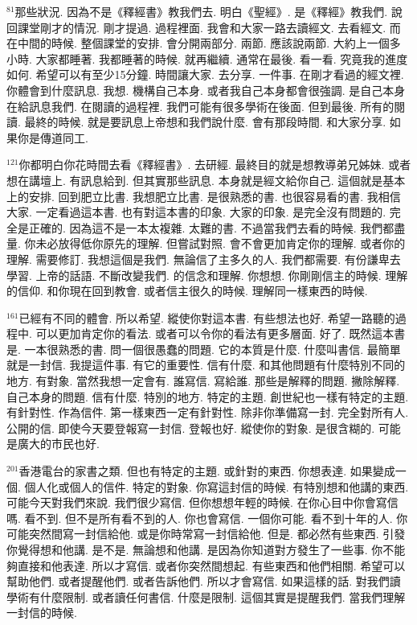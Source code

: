 \documentclass{book}
\begin{document}
$^{81}$那些狀況.
因為不是《釋經書》教我們去.
明白《聖經》.
是《釋經》教我們.
說回課堂剛才的情況.
剛才提過.
過程裡面.
我會和大家一路去讀經文.
去看經文.
而在中間的時候.
整個課堂的安排.
會分開兩部分.
兩節.
應該說兩節.
大約上一個多小時.
大家都睡著.
我都睡著的時候.
就再繼續.
通常在最後.
看一看.
究竟我的進度如何.
希望可以有至少15分鐘.
時間讓大家.
去分享.
一件事.
在剛才看過的經文裡.
你體會到什麼訊息.
我想.
機構自己本身.
或者我自己本身都會很強調.
是自己本身在給訊息我們.
在閱讀的過程裡.
我們可能有很多學術在後面.
但到最後.
所有的閱讀.
最終的時候.
就是要訊息上帝想和我們說什麼.
會有那段時間.
和大家分享.
如果你是傳道同工.

$^{121}$你都明白你花時間去看《釋經書》.
去研經.
最終目的就是想教導弟兄姊妹.
或者想在講壇上.
有訊息給到.
但其實那些訊息.
本身就是經文給你自己.
這個就是基本上的安排.
回到肥立比書.
我想肥立比書.
是很熟悉的書.
也很容易看的書.
我相信大家.
一定看過這本書.
也有對這本書的印象.
大家的印象.
是完全沒有問題的.
完全是正確的.
因為這不是一本太複雜.
太難的書.
不過當我們去看的時候.
我們都盡量.
你未必放得低你原先的理解.
但嘗試對照.
會不會更加肯定你的理解.
或者你的理解.
需要修訂.
我想這個是我們.
無論信了主多久的人.
我們都需要.
有份謙卑去學習.
上帝的話語.
不斷改變我們.
的信念和理解.
你想想.
你剛剛信主的時候.
理解的信仰.
和你現在回到教會.
或者信主很久的時候.
理解同一樣東西的時候.

$^{161}$已經有不同的體會.
所以希望.
縱使你對這本書.
有些想法也好.
希望一路聽的過程中.
可以更加肯定你的看法.
或者可以令你的看法有更多層面.
好了.
既然這本書是.
一本很熟悉的書.
問一個很愚蠢的問題.
它的本質是什麼.
什麼叫書信.
最簡單就是一封信.
我提這件事.
有它的重要性.
信有什麼.
和其他問題有什麼特別不同的地方.
有對象.
當然我想一定會有.
誰寫信.
寫給誰.
那些是解釋的問題.
撇除解釋.
自己本身的問題.
信有什麼.
特別的地方.
特定的主題.
創世紀也一樣有特定的主題.
有針對性.
作為信件.
第一樣東西一定有針對性.
除非你準備寫一封.
完全對所有人.
公開的信.
即使今天要登報寫一封信.
登報也好.
縱使你的對象.
是很含糊的.
可能是廣大的市民也好.

$^{201}$香港電台的家書之類.
但也有特定的主題.
或針對的東西.
你想表達.
如果變成一個.
個人化或個人的信件.
特定的對象.
你寫這封信的時候.
有特別想和他講的東西.
可能今天對我們來說.
我們很少寫信.
但你想想年輕的時候.
在你心目中你會寫信嗎.
看不到.
但不是所有看不到的人.
你也會寫信.
一個你可能.
看不到十年的人.
你可能突然間寫一封信給他.
或是你時常寫一封信給他.
但是.
都必然有些東西.
引發你覺得想和他講.
是不是.
無論想和他講.
是因為你知道對方發生了一些事.
你不能夠直接和他表達.
所以才寫信.
或者你突然間想起.
有些東西和他們相關.
希望可以幫助他們.
或者提醒他們.
或者告訴他們.
所以才會寫信.
如果這樣的話.
對我們讀學術有什麼限制.
或者讀任何書信.
什麼是限制.
這個其實是提醒我們.
當我們理解一封信的時候.
\end{document}
